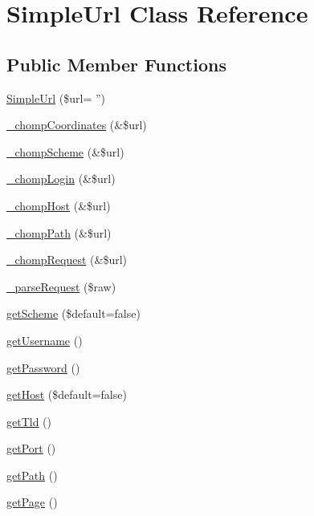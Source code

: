 \hypertarget{class_simple_url}{
\section{SimpleUrl Class Reference}
\label{class_simple_url}
}
\subsection*{Public Member Functions}
\begin{DoxyCompactItemize}
\item 
\hyperlink{class_simple_url_a9a1eb8b05dc012664cf56910520b96a2}{SimpleUrl} (\$url= '')
\item 
\hyperlink{class_simple_url_ad8bf75a7593335e51703bfbf083af970}{\_\-chompCoordinates} (\&\$url)
\item 
\hyperlink{class_simple_url_abc9b0e3099de7c313a91c75dca8ddd30}{\_\-chompScheme} (\&\$url)
\item 
\hyperlink{class_simple_url_a8dc8cc4e853a2561bb60dd002dff5f5f}{\_\-chompLogin} (\&\$url)
\item 
\hyperlink{class_simple_url_a5c9eeea66a62feeec54e2c3fb4507d86}{\_\-chompHost} (\&\$url)
\item 
\hyperlink{class_simple_url_a3effa6cba4d038184dad7cc1d3e1b43f}{\_\-chompPath} (\&\$url)
\item 
\hyperlink{class_simple_url_ae1e8e486c7b72b481bef06317195aa59}{\_\-chompRequest} (\&\$url)
\item 
\hyperlink{class_simple_url_adb792cc59598aacaaadb5adc428efda8}{\_\-parseRequest} (\$raw)
\item 
\hyperlink{class_simple_url_a567de036cb25671ade4c14489ed0f8a9}{getScheme} (\$default=false)
\item 
\hyperlink{class_simple_url_a23df1af0d73592a0077891311c557e32}{getUsername} ()
\item 
\hyperlink{class_simple_url_a84492f83d2c450cb1aa3fcb257817ec9}{getPassword} ()
\item 
\hyperlink{class_simple_url_ad2d630f807ac3818c59c51a76c447c73}{getHost} (\$default=false)
\item 
\hyperlink{class_simple_url_aff07635b90f4833decc7f52a8c808825}{getTld} ()
\item 
\hyperlink{class_simple_url_a5cdd0c001a318e2ea58babbf530c5fa1}{getPort} ()
\item 
\hyperlink{class_simple_url_a21ef0d5146b74d581769e4ea7d448316}{getPath} ()
\item 
\hyperlink{class_simple_url_aace12f22a6a7b394d85394d353b8153a}{getPage} ()

\end{DoxyCompactItemize}
